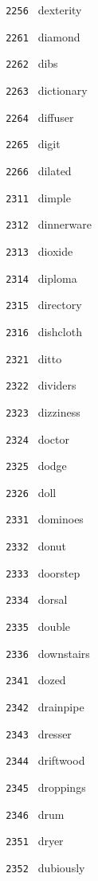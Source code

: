 \documentclass[11pt]{article}
\begin{document}
\begin{multicols}{6}
\noindent \texttt{ 2256 } dexterity  \par
\noindent \texttt{ 2261 } diamond  \par
\noindent \texttt{ 2262 } dibs  \par
\noindent \texttt{ 2263 } dictionary  \par
\noindent \texttt{ 2264 } diffuser  \par
\noindent \texttt{ 2265 } digit  \par
\noindent \texttt{ 2266 } dilated  \par
\noindent \texttt{ 2311 } dimple  \par
\noindent \texttt{ 2312 } dinnerware  \par
\noindent \texttt{ 2313 } dioxide  \par
\noindent \texttt{ 2314 } diploma  \par
\noindent \texttt{ 2315 } directory  \par
\noindent \texttt{ 2316 } dishcloth  \par
\noindent \texttt{ 2321 } ditto  \par
\noindent \texttt{ 2322 } dividers  \par
\noindent \texttt{ 2323 } dizziness  \par
\noindent \texttt{ 2324 } doctor  \par
\noindent \texttt{ 2325 } dodge  \par
\noindent \texttt{ 2326 } doll  \par
\noindent \texttt{ 2331 } dominoes  \par
\noindent \texttt{ 2332 } donut  \par
\noindent \texttt{ 2333 } doorstep  \par
\noindent \texttt{ 2334 } dorsal  \par
\noindent \texttt{ 2335 } double  \par
\noindent \texttt{ 2336 } downstairs  \par
\noindent \texttt{ 2341 } dozed  \par
\noindent \texttt{ 2342 } drainpipe  \par
\noindent \texttt{ 2343 } dresser  \par
\noindent \texttt{ 2344 } driftwood  \par
\noindent \texttt{ 2345 } droppings  \par
\noindent \texttt{ 2346 } drum  \par
\noindent \texttt{ 2351 } dryer  \par
\noindent \texttt{ 2352 } dubiously  \par

\end{multicols}
\end{document}
